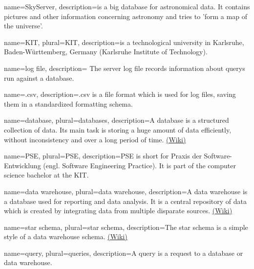 {
  name=SkyServer,
  description={is a big \gls{database} for astronomical data. It contains pictures
              and other information concerning astronomy and tries to 'form a 
              map of the universe'.
              }
}


{
  name=KIT,
  plural=KIT,
  description={is a technological university in Karlsruhe, Baden-Württemberg, Germany 
              (Karlsruhe Institute of Technology).}
}


{
  name=log file,
  description={
The server log file records information about \glspl{query} run against a  \gls{database}.}
}


{
  name=.csv,
  description={.csv is a file format which is used for log files, 
  saving them in a standardized formatting schema.}
}


{
  name=database,
  plural=databases,
  description={A database is a structured collection of data. Its main task is
  storing a huge amount of data efficiently, without inconsistency and over a long period of time.   
  \href{https://en.wikipedia.org/wiki/Database}{(Wiki)}}
}


{
  name=PSE,
  plural=PSE,
  description={PSE is short for Praxis der Software-Entwicklung (engl. Software Engineering Practice).
  It is part of the computer science bachelor at the \gls{KIT}.}
}


{
  name=data warehouse,
  plural=data warehouse,
  description={A data warehouse is a \gls{database} used for reporting and data analysis.
  It is a central repository of data which is created by integrating data from multiple disparate sources.
  \href{https://en.wikipedia.org/wiki/Data_warehouse}{(Wiki)}}
}
  
  
{
  name=star schema,
  plural=star schema,
  description={The star schema is a simple style of a \gls{data warehouse} schema.
 \href{https://en.wikipedia.org/wiki/Star_schema}{(Wiki)}}
}

  
{
  name=query,
  plural=queries,
  description={A query is a request to a \gls{database} or \gls{data warehouse}.}
}


